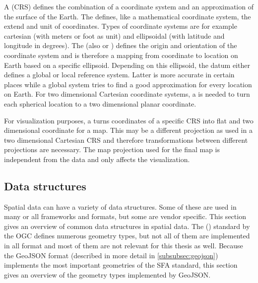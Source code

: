 		A  (CRS) defines the combination of a coordinate system and an approximation of the surface of the Earth.
		The  defines, like a mathematical coordinate system, the extend and unit of coordinates.
		Types of coordinate systems are for example cartesian (with meters or foot as unit) and ellipsoidal (with latitude and longitude in degrees)\cite[11-13]{ordenance-survey-booklet}.
		The  (also  or ) defines the origin and orientation of the coordinate system and is therefore a mapping from coordinate to location on Earth based on a specific ellipsoid.
		Depending on this ellipsoid, the datum either defines a global or local reference system.
		Latter is more accurate in certain places while a global system tries to find a good approximation for every location on Earth.
		For two dimensional Cartesian coordinate systems, a  is needed to turn each  spherical location to a two dimensional planar coordinate\cite[17]{ordenance-survey-booklet}.
		
		For visualization purposes, a  turns coordinates of a specific CRS into flat and two dimensional coordinate for a map.
		This may be a different projection as used in a two dimensional Cartesian CRS and therefore transformations between different projections are necessary.
		The map projection used for the final map is independent from the data and only affects the visualization.

	\subsection{Data structures}
	\label{subsec:data-structures}
	
		Spatial data can have a variety of data structures.
		Some of these are used in many or all frameworks and formats, but some are vendor specific.
		This section gives an overview of common data structures in spatial data.
		The  () standard by the OGC defines numerous geometry types\cite{ogc-sfa}, but not all of them are implemented in all format and most of them are not relevant for this thesis as well.
		Because the GeoJSON format (described in more detail in \cref{subsubsec:geojson}) implements the most important geometries of the SFA standard\cite[2]{ietf-geojson}, this section gives an overview of the geometry types implemented by GeoJSON.
		
